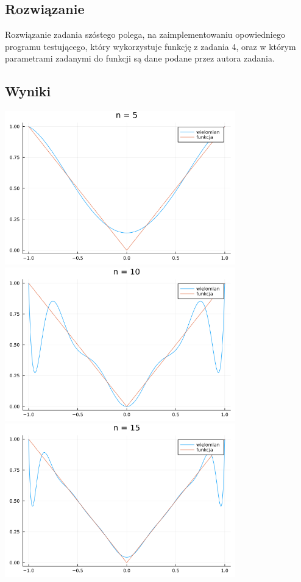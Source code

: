 \documentclass{article}
\begin{document}
\begin{center}
    \subsection{Rozwiązanie}
    \large Rozwiązanie zadania szóstego polega, na zaimplementowaniu opowiedniego programu testującego, który wykorzystuje funkcję z zadania 4,
     oraz w którym parametrami zadanymi do funkcji są dane podane przez autora zadania. 
    \subsection{Wyniki}
    \includegraphics[width=100mm]{z6f1_5.png}
    \includegraphics[width=100mm]{z6f1_10.png}
    \includegraphics[width=100mm]{z6f1_15.png}

\end{center}
\end{document}
